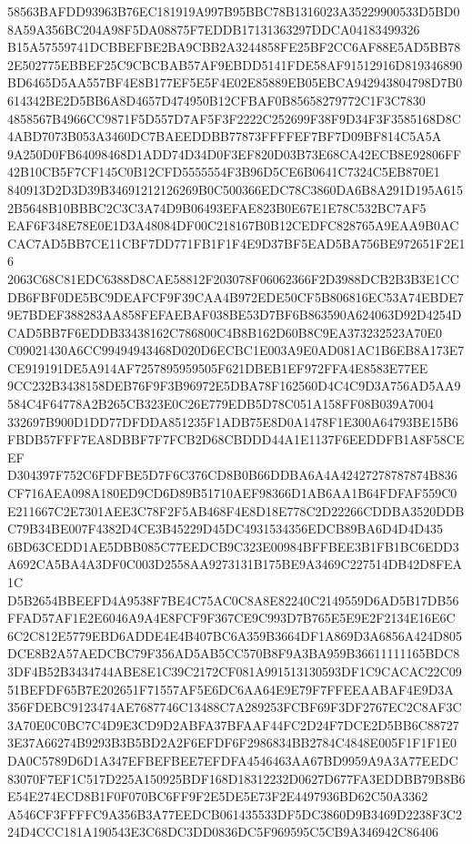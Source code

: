 \documentclass[UTF8,fontset=fandol,zihao=-4,a4paper]{ctexart}
\begin{document}
{{58563BAFDD93963B76EC181919A997B95BBC78B1316023A35229900533D5BD08A59A356BC204A98F5DA08875F7EDDB17131363297DDCA04183499326
B15A57559741DCBBEFBE2BA9CBB2A3244858FE25BF2CC6AF88E5AD5BB782E502775EBBEF25C9CBCBAB57AF9EBDD5141FDE58AF91512916D819346890
BD6465D5AA557BF4E8B177EF5E5F4E02E85889EB05EBCA942943804798D7B0614342BE2D5BB6A8D4657D474950B12CFBAF0B85658279772C1F3C7830
4858567B4966CC9871F5D557D7AF5F3F2222C252699F38F9D34F3F3585168D8C4ABD7073B053A3460DC7BAEEDDBB77873FFFFEF7BF7D09BF814C5A5A
9A250D0FB64098468D1ADD74D34D0F3EF820D03B73E68CA42ECB8E92806FF42B10CB5F7CF145C0B12CFD5555554F3B96D5CE6B0641C7324C5EB870E1
840913D2D3D39B34691212126269B0C500366EDC78C3860DA6B8A291D195A6152B5648B10BBBC2C3C3A74D9B06493EFAE823B0E67E1E78C532BC7AF5
EAF6F348E78E0E1D3A48084DF00C218167B0B12CEDFC828765A9EAA9B0ACCAC7AD5BB7CE11CBF7DD771FB1F1F4E9D37BF5EAD5BA756BE972651F2E16
2063C68C81EDC6388D8CAE58812F203078F06062366F2D3988DCB2B3B3E1CCDB6FBF0DE5BC9DEAFCF9F39CAA4B972EDE50CF5B806816EC53A74EBDE7
9E7BDEF388283AA858FEFAEBAF038BE53D7BF6B863590A624063D92D4254DCAD5BB7F6EDDB33438162C786800C4B8B162D60B8C9EA373232523A70E0
C09021430A6CC99494943468D020D6ECBC1E003A9E0AD081AC1B6EB8A173E7CE919191DE5A914AF7257895959505F621DBEB1EF972FFA4E8583E77EE
9CC232B3438158DEB76F9F3B96972E5DBA78F162560D4C4C9D3A756AD5AA9584C4F64778A2B265CB323E0C26E779EDB5D78C051A158FF08B039A7004
332697B900D1DD77DFDDA851235F1ADB75E8D0A1478F1E300A64793BE15B6FBDB57FFF7EA8DBBF7F7FCB2D68CBDDD44A1E1137F6EEDDFB1A8F58CEEF
D304397F752C6FDFBE5D7F6C376CD8B0B66DDBA6A4A42427278787874B836CF716AEA098A180ED9CD6D89B51710AEF98366D1AB6AA1B64FDFAF559C0
E211667C2E7301AEE3C78F2F5AB468F4E8D18E778C2D22266CDDBA3520DDBC79B34BE007F4382D4CE3B45229D45DC4931534356EDCB89BA6D4D4D435
6BD63CEDD1AE5DBB085C77EEDCB9C323E00984BFFBEE3B1FB1BC6EDD3A692CA5BA4A3DF0C003D2558AA9273131B175BE9A3469C227514DB42D8FEA1C
D5B2654BBEEFD4A9538F7BE4C75AC0C8A8E82240C2149559D6AD5B17DB56FFAD57AF1E2E6046A9A4E8FCF9F367CE9C993D7B765E5E9E2F2134E16E6C
6C2C812E5779EBD6ADDE4E4B407BC6A359B3664DF1A869D3A6856A424D805DCE8B2A57AEDCBC79F356AD5AB5CC570B8F9A3BA959B36611111165BDC8
3DF4B52B3434744ABE8E1C39C2172CF081A991513130593DF1C9CACAC22C0951BEFDF65B7E202651F71557AF5E6DC6AA64E9E79F7FFEEAABAF4E9D3A
356FDEBC9123474AE7687746C13488C7A289253FCBF69F3DF2767EC2C8AF3C3A70E0C0BC7C4D9E3CD9D2ABFA37BFAAF44FC2D24F7DCE2D5BB6C88727
3E37A66274B9293B3B5BD2A2F6EFDF6F2986834BB2784C4848E005F1F1F1E0DA0C5789D6D1A347EFBEFBEE7EFDFA4546463AA67BD9959A9A3A77EEDC
83070F7EF1C517D225A150925BDF168D18312232D0627D677FA3EDDBB79B8B6E54E274ECD8B1F0F070BC6FF9F2E5DE5E73F2E4497936BD62C50A3362
A546CF3FFFFC9A356B3A77EEDCB061435533DF5DC3860D9B3469D2238F3C224D4CCC181A190543E3C68DC3DD0836DC5F969595C5CB9A346942C86406
}}
\end{document}

